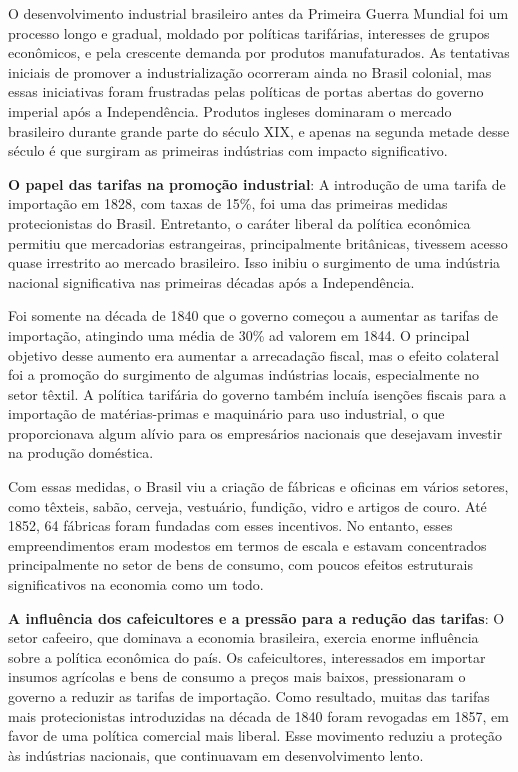 \documentclass[a4paper,12pt]{article}[abntex2]
\begin{document}
O desenvolvimento industrial brasileiro antes da Primeira Guerra Mundial foi um processo longo e gradual, moldado por políticas tarifárias, interesses de grupos econômicos, e pela crescente demanda por produtos manufaturados. As tentativas iniciais de promover a industrialização ocorreram ainda no Brasil colonial, mas essas iniciativas foram frustradas pelas políticas de portas abertas do governo imperial após a Independência. Produtos ingleses dominaram o mercado brasileiro durante grande parte do século XIX, e apenas na segunda metade desse século é que surgiram as primeiras indústrias com impacto significativo.

\textbf{O papel das tarifas na promoção industrial}: A introdução de uma tarifa de importação em 1828, com taxas de 15\%, foi uma das primeiras medidas protecionistas do Brasil. Entretanto, o caráter liberal da política econômica permitiu que mercadorias estrangeiras, principalmente britânicas, tivessem acesso quase irrestrito ao mercado brasileiro. Isso inibiu o surgimento de uma indústria nacional significativa nas primeiras décadas após a Independência.

Foi somente na década de 1840 que o governo começou a aumentar as tarifas de importação, atingindo uma média de 30\% ad valorem em 1844. O principal objetivo desse aumento era aumentar a arrecadação fiscal, mas o efeito colateral foi a promoção do surgimento de algumas indústrias locais, especialmente no setor têxtil. A política tarifária do governo também incluía isenções fiscais para a importação de matérias-primas e maquinário para uso industrial, o que proporcionava algum alívio para os empresários nacionais que desejavam investir na produção doméstica.

Com essas medidas, o Brasil viu a criação de fábricas e oficinas em vários setores, como têxteis, sabão, cerveja, vestuário, fundição, vidro e artigos de couro. Até 1852, 64 fábricas foram fundadas com esses incentivos. No entanto, esses empreendimentos eram modestos em termos de escala e estavam concentrados principalmente no setor de bens de consumo, com poucos efeitos estruturais significativos na economia como um todo.

\textbf{A influência dos cafeicultores e a pressão para a redução das tarifas}: O setor cafeeiro, que dominava a economia brasileira, exercia enorme influência sobre a política econômica do país. Os cafeicultores, interessados em importar insumos agrícolas e bens de consumo a preços mais baixos, pressionaram o governo a reduzir as tarifas de importação. Como resultado, muitas das tarifas mais protecionistas introduzidas na década de 1840 foram revogadas em 1857, em favor de uma política comercial mais liberal. Esse movimento reduziu a proteção às indústrias nacionais, que continuavam em desenvolvimento lento.
\end{document}
